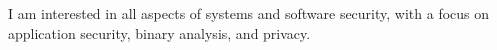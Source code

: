 

\begin{cvparagraph}
    I am interested in all aspects of systems and software security, with
    a focus on application security, binary analysis, and privacy.
\end{cvparagraph}
